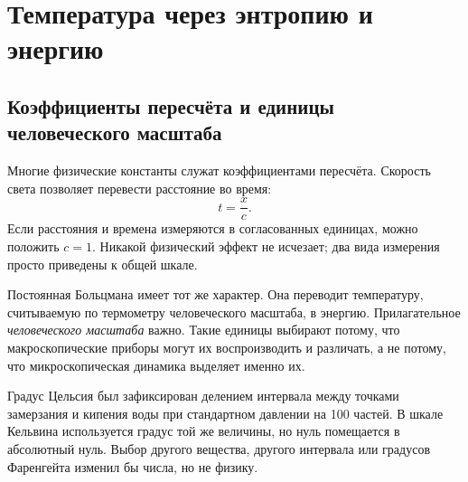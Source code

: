 \chapter{Температура через энтропию и энергию}


\section{Коэффициенты пересчёта и единицы человеческого масштаба}

Многие физические константы служат коэффициентами пересчёта. Скорость света позволяет перевести расстояние во время:
\begin{equation}
 t=\frac{x}{c}.
\end{equation}
Если расстояния и времена измеряются в согласованных единицах, можно положить \(c=1\). Никакой физический эффект не исчезает; два вида измерения просто приведены к общей шкале.

Постоянная Больцмана имеет тот же характер. Она переводит температуру, считываемую по термометру человеческого масштаба, в энергию. Прилагательное \emph{человеческого масштаба} важно. Такие единицы выбирают потому, что макроскопические приборы могут их воспроизводить и различать, а не потому, что микроскопическая динамика выделяет именно их.

Градус Цельсия был зафиксирован делением интервала между точками замерзания и кипения воды при стандартном давлении на 100 частей. В шкале Кельвина используется градус той же величины, но нуль помещается в абсолютный нуль. Выбор другого вещества, другого интервала или градусов Фаренгейта изменил бы числа, но не физику.

\begin{classroomqa}
\end{classroomqa}

